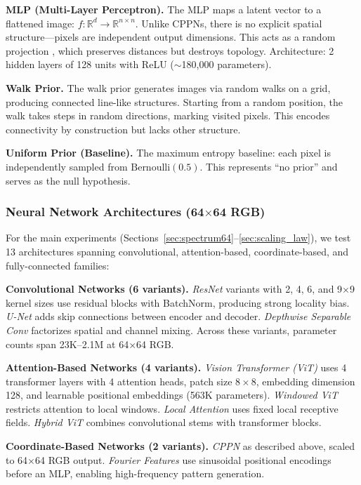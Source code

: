 \documentclass{article}
\begin{document}
\textbf{MLP (Multi-Layer Perceptron).}
The MLP maps a latent vector to a flattened image: $f: \mathbb{R}^{d} \to \mathbb{R}^{n \times n}$. Unlike CPPNs, there is no explicit spatial structure---pixels are independent output dimensions. This acts as a random projection \cite{johnson1984extensions}, which preserves distances but destroys topology. Architecture: 2 hidden layers of 128 units with ReLU ($\sim$180,000 parameters).

\textbf{Walk Prior.}
The walk prior generates images via random walks on a grid, producing connected line-like structures. Starting from a random position, the walk takes steps in random directions, marking visited pixels. This encodes connectivity by construction but lacks other structure.

\textbf{Uniform Prior (Baseline).}
The maximum entropy baseline: each pixel is independently sampled from $\text{Bernoulli}(0.5)$. This represents ``no prior'' and serves as the null hypothesis.

\subsubsection{Neural Network Architectures (64$\times$64 RGB)}

For the main experiments (Sections~\ref{sec:spectrum64}--\ref{sec:scaling_law}), we test 13 architectures spanning convolutional, attention-based, coordinate-based, and fully-connected families:

\textbf{Convolutional Networks (6 variants).}
\emph{ResNet} variants with 2, 4, 6, and 9$\times$9 kernel sizes use residual blocks with BatchNorm, producing strong locality bias. \emph{U-Net} adds skip connections between encoder and decoder. \emph{Depthwise Separable Conv} factorizes spatial and channel mixing. Across these variants, parameter counts span 23K--2.1M at 64$\times$64 RGB.

\textbf{Attention-Based Networks (4 variants).}
\emph{Vision Transformer (ViT)} uses 4 transformer layers with 4 attention heads, patch size $8 \times 8$, embedding dimension 128, and learnable positional embeddings (563K parameters). \emph{Windowed ViT} restricts attention to local windows. \emph{Local Attention} uses fixed local receptive fields. \emph{Hybrid ViT} combines convolutional stems with transformer blocks.

\textbf{Coordinate-Based Networks (2 variants).}
\emph{CPPN} as described above, scaled to 64$\times$64 RGB output. \emph{Fourier Features} \cite{tancik2020fourier} use sinusoidal positional encodings before an MLP, enabling high-frequency pattern generation.
\end{document}
